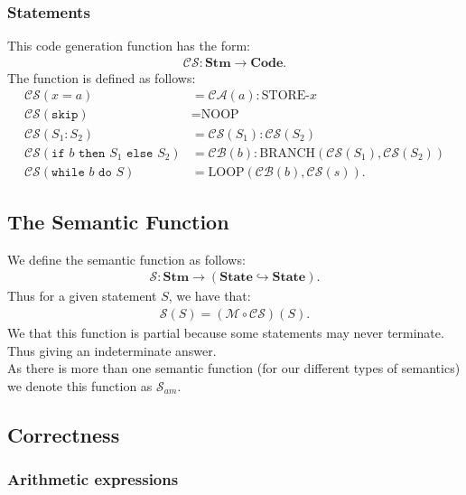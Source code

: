 \documentclass[a4paper, 12pt, twoside]{article}
\begin{document}
\subsubsection{Statements}

This code generation function has the form: \begin{gather*}
  \mathcal{CS} : \textbf{Stm} \to \textbf{Code}.
\end{gather*} The function is defined as follows: \begin{align*}
  \mathcal{CS}(x = a) &= \mathcal{CA}(a):\text{STORE-}x \\
  \mathcal{CS}(\texttt{skip}) &= \text{NOOP} \\
  \mathcal{CS}(S_1:S_2) &= \mathcal{CS}(S_1):\mathcal{CS}(S_2) \\
  \mathcal{CS}(
    \texttt{if } b \texttt{ then } S_1 \texttt{ else } S_2
  ) &= \mathcal{CB}(b):\text{BRANCH}(\mathcal{CS}(S_1), \mathcal{CS}(S_2)) \\
  \mathcal{CS}(
    \texttt{while } b \texttt{ do } S
  ) &= \text{LOOP}(\mathcal{CB}(b), \mathcal{CS}(s)).
\end{align*}

\subsection{The Semantic Function}

We define the semantic function as follows: \begin{gather*}
  \mathcal{S}: \textbf{Stm} \to (\textbf{State} \hookrightarrow \textbf{State}).
\end{gather*} Thus for a given statement $S$, we have that: \begin{gather*}
  \mathcal{S}(S) = (\mathcal{M} \circ \mathcal{CS})(S).
\end{gather*} We that this function is partial because some statements
may never terminate. Thus giving an indeterminate answer.
\\[\baselineskip]
As there is more than one semantic function (for our different types
of semantics) we denote this function as $\mathcal{S}_{am}$.

\subsection{Correctness}

\subsubsection{Arithmetic expressions}
\end{document}

